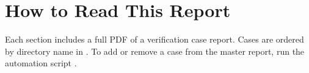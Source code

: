 \section*{How to Read This Report}

Each section includes a full PDF of a verification case report. Cases are ordered by directory name in .
To add or remove a case from the master report, run the automation script .

